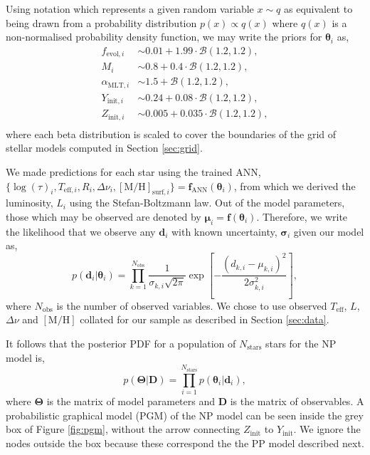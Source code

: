 \documentclass[a4paper,fleqn,usenatbib]{mnras}
\newcommand{\dnu}{\ensuremath{\Delta\nu}}
\newcommand{\metallicity}{\ensuremath{[\mathrm{M}/\mathrm{H}]}}
\newcommand{\teff}{\ensuremath{T_\mathrm{eff}}}
\begin{document}
Using notation which represents a given random variable $x \sim q$ as equivalent to being drawn from a probability distribution $p(x) \propto q(x)$ where $q(x)$ is a non-normalised probability density function, we may write the priors for $\boldsymbol{\theta}_i$ as,
%
\begin{align*}
    f_{\mathrm{evol}, i} &\sim 0.01 + 1.99 \cdot \mathcal{B}(1.2, 1.2),\\
    M_i &\sim 0.8 + 0.4 \cdot \mathcal{B}(1.2, 1.2),\\
    \alpha_{\mathrm{MLT}, i} &\sim 1.5 + \mathcal{B}(1.2, 1.2),\\
    Y_{\mathrm{init}, i} &\sim 0.24 + 0.08 \cdot \mathcal{B}(1.2, 1.2),\\
    Z_{\mathrm{init}, i} &\sim 0.005 + 0.035 \cdot \mathcal{B}(1.2, 1.2),\\
\end{align*}
%
where each beta distribution is scaled to cover the boundaries of the grid of stellar models computed in Section \ref{sec:grid}.

We made predictions for each star using the trained ANN, $\{\log(\tau)_i, T_{\mathrm{eff}, i}, R_i, \dnu_i, \metallicity_{\mathrm{surf}, i}\} = \boldsymbol{f}_{\mathrm{ANN}}(\boldsymbol{\theta}_i)$, from which we derived the luminosity, $L_i$ using the Stefan-Boltzmann law. Out of the model parameters, those which may be observed are denoted by ${\boldsymbol{\mu}}_{i} = {\boldsymbol{f}}(\boldsymbol{\theta}_i)$. Therefore, we write the likelihood that we observe any $\boldsymbol{d}_i$ with known uncertainty, $\boldsymbol{\sigma}_{i}$ given our model as,
%
\begin{equation}
    p(\boldsymbol{d}_i | \boldsymbol{\theta}_i) = \prod_{k=1}^{N_\mathrm{obs}} \frac{1}{\sigma_{k, i} \sqrt{2\pi}} \exp\left[ - \frac{(d_{k, i} - \mu_{k, i})^2}{2 \sigma_{k, i}^2} \right],
    \label{eq:like}
\end{equation}
%
where $N_\mathrm{obs}$ is the number of observed variables. We chose to use observed $\teff$, $L$, $\dnu$ and $\metallicity$ collated for our sample as described in Section \ref{sec:data}.

It follows that the posterior PDF for a population of $N_\mathrm{stars}$ stars for the NP model is, 
%
\begin{equation}
    p(\boldsymbol{\Theta} | \boldsymbol{D}) = \prod_{i=1}^{N_{\mathrm{stars}}} p(\boldsymbol{\theta}_i | \boldsymbol{d}_i),   
\end{equation}
%
where $\boldsymbol{\Theta}$ is the matrix of model parameters and $\boldsymbol{D}$ is the matrix of observables. A probabilistic graphical model (PGM) of the NP model can be seen inside the grey box of Figure \ref{fig:pgm}, without the arrow connecting $Z_\mathrm{init}$ to $Y_\mathrm{init}$. We ignore the nodes outside the box because these correspond the the PP model described next.
\end{document}

